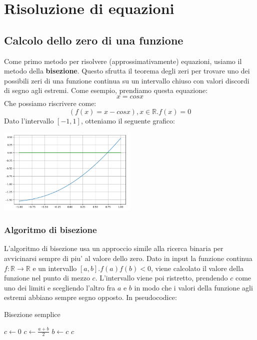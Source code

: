 \documentclass{report}
\begin{document}
\chapter{Risoluzione di equazioni}
\section{Calcolo dello zero di una funzione}
Come primo metodo per risolvere (approssimativamente) equazioni, usiamo il metodo della \textbf{bisezione}. Questo sfrutta il teorema degli zeri per trovare uno dei possibili zeri di una funzione continua su un intervallo chiuso con valori discordi di segno agli estremi. Come esempio, prendiamo questa equazione:
\[
x = cos x
\]
Che possiamo riscrivere come:
\[
  (f(x) = x-cos x), x \in \mathbb{R}. f(x) = 0
\]
Dato l'intervallo $ [-1, 1] $, otteniamo il seguente grafico:
\begin{center}
  \includegraphics[width=0.5\textwidth]{img/2024-09-23-12-11-58.png}
\end{center}
\subsection{Algoritmo di bisezione}
L'algoritmo di bisezione usa un approccio simile alla ricerca binaria per avvicinarsi sempre di piu' al valore dello zero. Dato in input la funzione continua $ f:\mathbb{R}\to\mathbb{R} $ e un intervallo $ [a,b]. f(a)f(b)<0 $, viene calcolato il valore della funzione nel punto di mezzo $ c $. L'intervallo viene poi ristretto, prendendo $ c $ come uno dei limiti e scegliendo l'altro fra $ a $ e $ b $ in modo che i valori della funzione agli estremi abbiano sempre segno opposto. In pseudocodice:

\begin{algorithm}[H]
\caption{Bisezione semplice}
\SetAlgoLined
\SetNoFillComment
\vspace{3mm}
$c \leftarrow 0$\;
 {
    $ c \gets \frac{a+b}{2} $\;
     {
      $ b \gets c $
    }
}
\Return $ c $
\end{algorithm}
\end{document}

